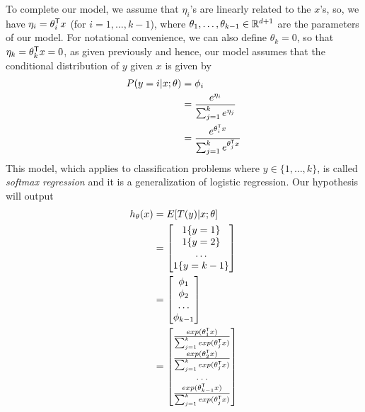 To complete our model, we assume that $\eta_i$'s are linearly related to the $x$’s, so, we have 
$\eta_i = \theta_i ^ \mathsf{T}x$ (for $i = 1, \dots, k-1$), where $\theta_1, \dots, \theta_{k-1} \in \mathbb{R}^{d+1}$
are the parameters of our model.\newline
For notational convenience, we can also define $\theta_k = 0$, so that $\eta_k = \theta_k ^ \mathsf{T}x = 0$,
as given previously and hence, our model assumes that the conditional distribution of $y$ given $x$ is given by
\begin{align*}
    P(y = i | x; \theta) & = \phi_i \\
                         & = \frac{e^{\eta_i}}{\sum _{j=1}^k e^{\eta_j}} \\
                         & = \frac{e^{\theta_i ^ \mathsf{T}x}}{\sum _{j=1}^k e^{\theta_j ^ \mathsf{T}x}} \\
\end{align*}
This model, which applies to classification problems where $y \in \{1, \dots, k \}$, is called \emph{softmax regression}
and it is a generalization of logistic regression.\newline
Our hypothesis will output
\begin{align*}
    h_{\theta}(x) & = E[T(y) | x; \theta] \\
                  & = \begin{bmatrix}
                      1\{y = 1\} \\
                      1\{y = 2\} \\
                      \dots \\
                      1\{y = k - 1\} \\
                      \end{bmatrix} \\
                  & = \begin{bmatrix}
                      \phi_1 \\
                      \phi_2 \\
                      \dots \\
                      \phi_{k-1} \\
                      \end{bmatrix} \\
                  & = \begin{bmatrix}
                      \frac{exp(\theta_1 ^ \mathsf{T}x)}{\sum _{j=1}^k exp(\theta_j ^ \mathsf{T}x)} \\
                      \frac{exp(\theta_2 ^ \mathsf{T}x)}{\sum _{j=1}^k exp(\theta_j ^ \mathsf{T}x)} \\
                      \dots \\
                      \frac{exp(\theta_{k-1} ^ \mathsf{T}x)}{\sum _{j=1}^k exp(\theta_j ^ \mathsf{T}x)} \\
                      \end{bmatrix} \\
\end{align*}
